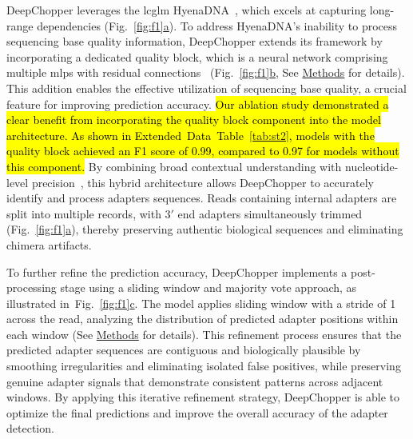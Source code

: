 \documentclass[pdflatex,sn-nature, lineno]{sn-jnl}%
\newcommand{\figref}[2]{Fig.~\hyperref[#1]{\ref*{#1}#2}}
\newcommand{\edtableref}[2]{Extended Data Table~\hyperref[#1]{\ref*{#1}#2}}
\begin{document}
DeepChopper leverages the \gls{lcglm} HyenaDNA~\cite{nguyen2024hyenadna}, which excels at capturing long-range dependencies (\figref{fig:f1}{a}).
To address HyenaDNA's inability to process sequencing base quality information, DeepChopper extends its framework by incorporating a dedicated quality block, which is a neural network comprising multiple \glspl{mlp} with residual connections~\cite{he2015deep} (\figref{fig:f1}{b}, See \hyperref[sec:methods]{Methods} for details).
This addition enables the effective utilization of sequencing base quality, a crucial feature for improving prediction accuracy.
\hl{Our ablation study demonstrated a clear benefit from incorporating the quality block component into the model architecture.
As shown in \mbox{\edtableref{tab:st2}{}}, models with the quality block achieved an F1 score of 0.99, compared to 0.97 for models without this component.}
By combining broad contextual understanding with nucleotide-level precision~\cite{poli2023hyena}, this hybrid architecture allows DeepChopper to accurately identify and process adapters sequences.
Reads containing internal adapters are split into multiple records, with $3'$ end adapters simultaneously trimmed (\figref{fig:f1}{a}), thereby preserving authentic biological sequences and eliminating chimera artifacts.

To further refine the prediction accuracy, DeepChopper implements a post-processing stage using a sliding window and majority vote approach, as illustrated in~\figref{fig:f1}{c}.
The model applies sliding window with a stride of 1 across the read, analyzing the distribution of predicted adapter positions within each window (See \hyperref[sec:methods]{Methods} for details).
This refinement process ensures that the predicted adapter sequences are contiguous and biologically plausible by smoothing irregularities and eliminating isolated false positives, while preserving genuine adapter signals that demonstrate consistent patterns across adjacent windows.
By applying this iterative refinement strategy, DeepChopper is able to optimize the final predictions and improve the overall accuracy of the adapter detection.
\end{document}
